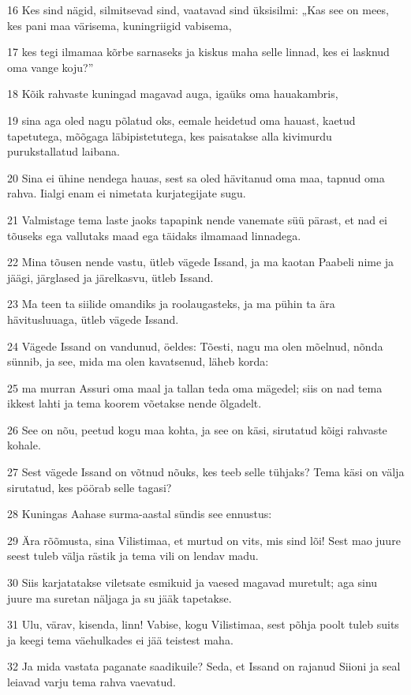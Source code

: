 \par 16 Kes sind nägid, silmitsevad sind, vaatavad sind üksisilmi: „Kas see on mees, kes pani maa värisema, kuningriigid vabisema,
\par 17 kes tegi ilmamaa kõrbe sarnaseks ja kiskus maha selle linnad, kes ei lasknud oma vange koju?”
\par 18 Kõik rahvaste kuningad magavad auga, igaüks oma hauakambris,
\par 19 sina aga oled nagu põlatud oks, eemale heidetud oma hauast, kaetud tapetutega, mõõgaga läbipistetutega, kes paisatakse alla kivimurdu purukstallatud laibana.
\par 20 Sina ei ühine nendega hauas, sest sa oled hävitanud oma maa, tapnud oma rahva. Iialgi enam ei nimetata kurjategijate sugu.
\par 21 Valmistage tema laste jaoks tapapink nende vanemate süü pärast, et nad ei tõuseks ega vallutaks maad ega täidaks ilmamaad linnadega.
\par 22 Mina tõusen nende vastu, ütleb vägede Issand, ja ma kaotan Paabeli nime ja jäägi, järglased ja järelkasvu, ütleb Issand.
\par 23 Ma teen ta siilide omandiks ja roolaugasteks, ja ma pühin ta ära hävitusluuaga, ütleb vägede Issand.
\par 24 Vägede Issand on vandunud, öeldes: Tõesti, nagu ma olen mõelnud, nõnda sünnib, ja see, mida ma olen kavatsenud, läheb korda:
\par 25 ma murran Assuri oma maal ja tallan teda oma mägedel; siis on nad tema ikkest lahti ja tema koorem võetakse nende õlgadelt.
\par 26 See on nõu, peetud kogu maa kohta, ja see on käsi, sirutatud kõigi rahvaste kohale.
\par 27 Sest vägede Issand on võtnud nõuks, kes teeb selle tühjaks? Tema käsi on välja sirutatud, kes pöörab selle tagasi?
\par 28 Kuningas Aahase surma-aastal sündis see ennustus:
\par 29 Ära rõõmusta, sina Vilistimaa, et murtud on vits, mis sind lõi! Sest mao juure seest tuleb välja rästik ja tema vili on lendav madu.
\par 30 Siis karjatatakse viletsate esmikuid ja vaesed magavad muretult; aga sinu juure ma suretan näljaga ja su jääk tapetakse.
\par 31 Ulu, värav, kisenda, linn! Vabise, kogu Vilistimaa, sest põhja poolt tuleb suits ja keegi tema väehulkades ei jää teistest maha.
\par 32 Ja mida vastata paganate saadikuile? Seda, et Issand on rajanud Siioni ja seal leiavad varju tema rahva vaevatud.

